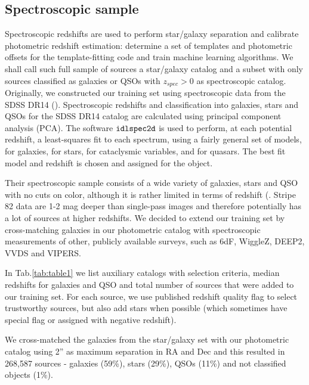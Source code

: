 \documentclass[apj,iop]{emulateapj}
\begin{document}
\subsection{Spectroscopic sample}
Spectroscopic redshifts are used to perform star/galaxy separation and calibrate photometric redshift estimation: determine a set of templates and photometric offsets for the template-fitting code and train machine learning algorithms. We shall call such full sample of sources a star/galaxy catalog and a subset with only sources classified as galaxies or QSOs with $z_{spec}>0$ as spectroscopic catalog. Originally, we constructed our training set using spectroscopic data from the SDSS DR14 (\citet{Bolton2012a}). Spectroscopic redshifts and classification into galaxies, stars and QSOs for the SDSS DR14 catalog are calculated using principal component analysis (PCA). The software $\tt idlspec2d$ is used to perform, at each potential redshift, a least-squares fit to each spectrum, using a fairly general set of models, for galaxies, for stars, for cataclysmic variables, and for quasars. The best fit model and redshift is chosen and assigned for the object.

Their spectroscopic sample consists of a wide variety of galaxies, stars and QSO with no cuts on color, although it is rather limited in terms of redshift (\citet{Strauss2002}. Stripe 82 data are 1-2 mag deeper than single-pass images and therefore potentially has a lot of sources at higher redshifts. We decided to extend our training set by cross-matching galaxies in our photometric catalog with spectroscopic measurements of other, publicly available surveys, such as 6dF, WiggleZ, DEEP2, VVDS and VIPERS.

In Tab.\ref{tab:table1} we list auxiliary catalogs with selection criteria, median redshifts for galaxies and QSO and total number of sources that were added to our training set. For each source, we use published redshift quality flag to select trustworthy sources, but also add stars when possible (which sometimes have special flag or assigned with negative redshift).

We cross-matched the galaxies from the star/galaxy set with our photometric catalog using 2'' as maximum separation in RA and Dec and this resulted in 268,587 sources - galaxies (59\%), stars (29\%), QSOs (11\%) and not classified objects (1\%).
\end{document}

